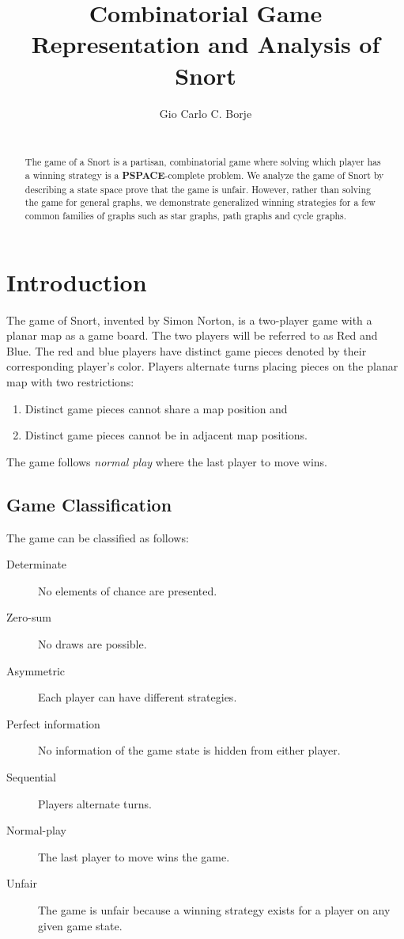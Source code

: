 \documentclass{sig-alternate}
\begin{document}
\title{Combinatorial Game Representation and Analysis of Snort}
\author{
	Gio Carlo C. Borje \\
	 \\
}
\maketitle

\begin{abstract}
The game of a Snort is a partisan, combinatorial game where solving which
player has a winning strategy is a \textbf{PSPACE}-complete problem. We
analyze the game of Snort by describing a state space prove that the game is
unfair. However, rather than solving the game for general graphs, we
demonstrate generalized winning strategies for a few common families of graphs
such as star graphs, path graphs and cycle graphs.
\end{abstract}

\section{Introduction}

The game of Snort, invented by Simon Norton, is a two-player game with a planar
map as a game board. The two players will be referred to as Red and Blue. The
red and blue players have distinct game pieces denoted by their corresponding
player's color. Players alternate turns placing pieces on the planar map with
two restrictions:
\begin{enumerate}
	\item Distinct game pieces cannot share a map position and
	\item Distinct game pieces cannot be in adjacent map positions.
\end{enumerate}
The game follows \emph{normal play} where the last player to move wins.

\subsection{Game Classification}

The game can be classified as follows:
\begin{description}
	\item [Determinate] No elements of chance are presented.
	\item [Zero-sum] No draws are possible.
	\item [Asymmetric] Each player can have different strategies.
	\item [Perfect information] No information of the game state is hidden from
		either player.
	\item [Sequential] Players alternate turns.
	\item [Normal-play] The last player to move wins the game.
	\item [Unfair] The game is unfair because a winning strategy exists for a
		player on any given game state.
\end{description}
\end{document}
